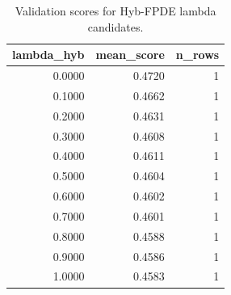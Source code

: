 \begin{table}[t]
\caption{Validation scores for Hyb-FPDE lambda candidates.}
\label{tab:lambda_distribution_computed}
\centering
\begin{tabular}{rrr}
\toprule
lambda\_hyb & mean\_score & n\_rows \\
\midrule
0.0000 & 0.4720 & 1 \\
0.1000 & 0.4662 & 1 \\
0.2000 & 0.4631 & 1 \\
0.3000 & 0.4608 & 1 \\
0.4000 & 0.4611 & 1 \\
0.5000 & 0.4604 & 1 \\
0.6000 & 0.4602 & 1 \\
0.7000 & 0.4601 & 1 \\
0.8000 & 0.4588 & 1 \\
0.9000 & 0.4586 & 1 \\
1.0000 & 0.4583 & 1 \\
\bottomrule
\end{tabular}

\end{table}
